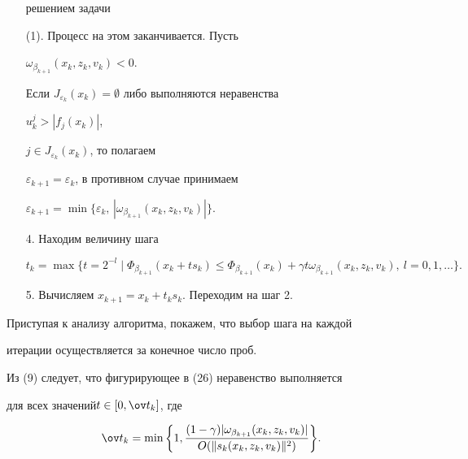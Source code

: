\begin{itemize}
решением задачи 


(1). Процесс на этом заканчивается. Пусть 


$\omega_{\beta_{k+1}}(x_k,z_k,v_k)<0$. 


Если $J_{\varepsilon_k}(x_k)=\emptyset$ либо выполняются неравенства 


$u^j_k>|f_j(x_k)|$, 


$j\in J_{\varepsilon_k}(x_k)$, то полагаем 


$\varepsilon_{k+1}=\varepsilon_k$, в противном случае принимаем 


$\varepsilon_{k+1}= 


\min\{\varepsilon_k,\,|\omega_{\beta_{k+1}}(x_k,z_k,v_k)|\}$. 


\item[4.] Находим величину шага 


\begin{equation} 


t_k=\max\{t=2^{-l}\mid \Phi_{\beta_{k+1}}(x_k+t s_k)\le 


\Phi_{\beta_{k+1}}(x_k)+\gamma t 


\omega_{\beta_{k+1}}(x_k,z_k,v_k),\ l=0,1,\dotsc\}. 


\end{equation} 


\item[5.] Вычисляем $x_{k+1}=x_k+t_k s_k$. Переходим на шаг 2. 


\end{itemize} 


 


Приступая к анализу алгоритма, покажем, что выбор шага на каждой 


итерации осуществляется за конечное число проб. 


 


Из (9) следует, что фигурирующее в (26) неравенство выполняется 


для всех значений\linebreak $t\in[0,\ov t_k]$, где 


\begin{equation} 


\ov t_k=\min\bigg\{1, 


\frac{(1-\gamma)|\omega_{\beta_{k+1}}(x_k,z_k,v_k)|} 


{O(\|s_k(x_k,z_k,v_k)\|^2)}\bigg\}. 


\end{equation} 


